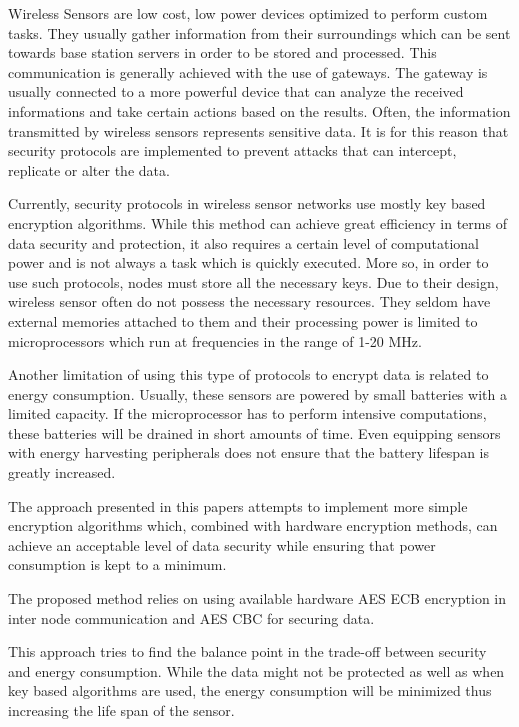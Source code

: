 Wireless Sensors are low cost, low power devices optimized to perform custom tasks. They usually
gather information from their surroundings which can be sent towards base station servers in order
to be stored and processed. This communication is generally achieved with the use of gateways. The
gateway is usually connected to a more powerful device that can analyze the received informations and take certain actions based on the results. Often, the information transmitted by wireless sensors represents sensitive data. It is for this reason that security protocols are implemented to prevent attacks that can intercept, replicate or alter the data.

Currently, security protocols in wireless sensor networks use mostly key based encryption algorithms. While this method can achieve 
great efficiency in terms of data security and protection, it also requires a certain level of computational power and is not 
always a task which is quickly executed. More so, in order to use such protocols, nodes must store all the necessary keys.
Due to their design, wireless sensor often do not possess the necessary resources. They seldom have external memories attached 
to them and their processing power is limited to microprocessors which run at frequencies in the
range of 1-20 MHz.

Another limitation of using this type of protocols to encrypt data is related to energy consumption. Usually, these sensors are 
powered by small batteries with a limited capacity. If the microprocessor has to perform intensive computations, these batteries 
will be drained in short amounts of time. Even equipping sensors with energy harvesting peripherals does not ensure that 
the battery lifespan is greatly increased.

The approach presented in this papers attempts to implement more simple encryption algorithms which, combined with hardware 
encryption methods, can achieve an acceptable level of data security while ensuring that power consumption is kept to a minimum.

The proposed method relies on using available hardware AES ECB encryption in inter node
communication and AES CBC for securing data.

This approach tries to find the balance point in the trade-off between security and energy consumption. While the data might not be 
protected as well as when key based algorithms are used, the energy consumption will be minimized thus increasing the life span of the sensor.
